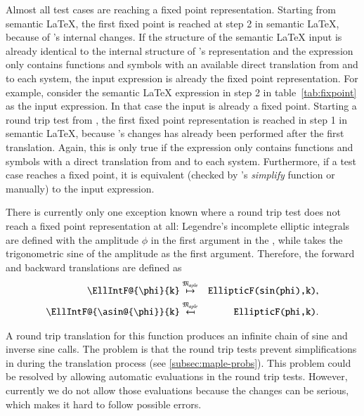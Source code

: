 Almost all test cases are reaching a fixed point representation. Starting from semantic \LaTeX, the first fixed point is reached at step 2 in semantic \LaTeX, because of \Maple's internal changes. If the structure of the semantic \LaTeX{} input is already identical to the internal structure of \Maple's representation and the expression only contains functions and symbols with an available direct translation from and to each system, the input expression is already the fixed point representation. For example, consider the semantic \LaTeX{} expression in step 2 in table~\ref{tab:fixpoint} as the input expression. In that case the input is already a fixed point. Starting a round trip test from \Maple, the first fixed point representation is reached in step 1 in semantic \LaTeX, because \Maple's changes has already been performed after the first translation. Again, this is only true if the expression only contains functions and symbols with a direct translation from and to each system. Furthermore, if a test case reaches a fixed point, it is equivalent (checked by \Maple's \textit{simplify} function or manually) to the input expression.

There is currently only one exception known where a round trip test does not reach a fixed point representation at all: Legendre's incomplete elliptic integrals~\parencite[(19.2.4-7)]{NIST:DLMF} are defined with the amplitude $\phi$ in the first argument in the \DLMF, while \Maple{} takes the trigonometric sine of the amplitude as the first argument. Therefore, the forward and backward translations are defined as
\begin{eqnarray}
\verb|\EllIntF@{\phi}{k}| & \overset{\langMaple}{\mapsto} & \verb|EllipticF(sin(phi),k)|,\\
\verb|\EllIntF@{\asin@{\phi}}{k}| & \overset{\langMaple}{\mapsfrom} & \verb|EllipticF(phi,k)|.
\end{eqnarray}

A round trip translation for this function produces an infinite chain of sine and inverse sine calls. The problem is that the round trip tests prevent simplifications in \Maple{} during the translation process (see \cref{subsec:maple-probs}). This problem could be resolved by allowing automatic evaluations in the round trip tests. However, currently we do not allow those evaluations because the changes can be serious, which makes it hard to follow possible errors.

